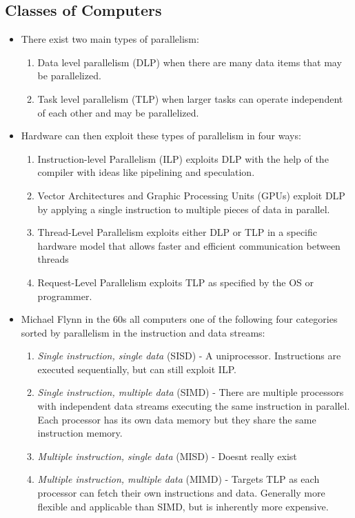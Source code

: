 \documentclass[11pt, a4paper]{article}
\theoremstyle{definition}
\theoremstyle{remark}
\begin{document}
\subsection{Classes of Computers}
\begin{itemize}
    \item There exist two main types of parallelism:
    \begin{enumerate}
        \item Data level parallelism (DLP) when there are many data items that may be parallelized.
        \item Task level parallelism (TLP) when larger tasks can operate independent of each other and may be parallelized.
    \end{enumerate}
    \item Hardware can then exploit these types of parallelism in four ways:
    \begin{enumerate}
        \item Instruction-level Parallelism (ILP) exploits DLP with the help of the compiler with ideas like pipelining and speculation.
        \item Vector Architectures and Graphic Processing Units (GPUs) exploit DLP by applying a single instruction to multiple pieces of data in parallel.
        \item Thread-Level Parallelism exploits either DLP or TLP in a specific hardware model that allows faster and efficient communication between threads
        \item Request-Level Parallelism exploits TLP as specified by the OS or programmer.
    \end{enumerate}
    \item Michael Flynn in the 60s all computers one of the following four categories sorted by parallelism in the instruction and data streams:
    \begin{enumerate}
        \item \textit{Single instruction, single data} (SISD) - A uniprocessor. Instructions are executed sequentially, but can still exploit ILP.
        \item \textit{Single instruction, multiple data} (SIMD) - There are multiple processors with independent data streams executing the same instruction in parallel. Each processor has its own data memory but they share the same instruction memory.
        \item \textit{Multiple instruction, single data} (MISD) - Doesnt really exist
        \item \textit{Multiple instruction, multiple data} (MIMD) - Targets TLP as each processor can fetch their own instructions and data. Generally more flexible and applicable than SIMD, but is inherently more expensive.
    \end{enumerate}
\end{itemize}
\end{document}

